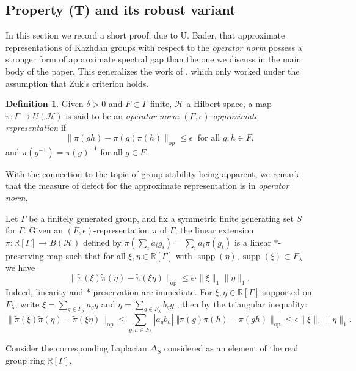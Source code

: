 \documentclass[11pt]{amsart}
\DeclareMathOperator{\op}{op}
\DeclareMathOperator{\supp}{supp}
\newcommand{\cH}{{\mathcal{H}}}
\theoremstyle{definition}
\newtheorem{definition}[theorem]{Definition}
\theoremstyle{remark}
\theoremstyle{definition}
\begin{document}
\subsection{Property (T) and its robust variant}\label{appendix:Bader}



In this section we record a short proof, due to U. Bader, that approximate representations of Kazhdan groups with respect to the \emph{operator norm} possess a stronger form of approximate spectral gap than the one we discuss in the main body of the paper.
This generalizes the work of \cite{Manuilov2007OnAR}, which only worked under the assumption that Zuk's criterion holds.


\begin{definition}
Given $\delta > 0$ and $F \subset \Gamma$ finite, $\cH$ a Hilbert space, a map $\pi: \Gamma \to U(\mathcal H)$ is said to be an \emph{operator norm $(F, \epsilon)$-approximate representation} if
$$ \| \pi(gh) - \pi(g) \pi(h) \|_{\op} \leq \epsilon\; \text{ for all $g,h \in F$,}$$
and $\pi(g^{-1}) = \pi(g)^{-1}$ for all $g \in F$.
\end{definition}

With the connection to the topic of group stability being apparent, we remark that the measure of defect for the approximate representation is in \emph{operator norm}.


Let $\Gamma$ be a finitely generated group, and fix a symmetric finite generating set $S$ for $\Gamma$.
Given an $(F,\epsilon)$-representation $\pi$ of $\Gamma$, the linear extension $\tilde{\pi}: \mathbb R[\Gamma] \to B(\mathcal H)$ defined by $\tilde{\pi}(\sum_i a_i g_i) = \sum_i a_i \pi(g_i)$
is a linear $*$-preserving map such that for all $\xi, \eta \in \mathbb R[\Gamma]$ with $\supp(\eta), \supp(\xi) \subset F_\lambda$ we have
$$\| \tilde{\pi}(\xi)\tilde{\pi}(\eta) - \tilde{\pi}(\xi\eta) \|_{\op} \leq \epsilon \cdot \| \xi \|_1 \| \eta \|_1.$$
Indeed, linearity and $*$-preservation are immediate. For $\xi, \eta \in \mathbb R[\Gamma]$ supported on $F_\lambda$, write $\xi = \sum_{g \in F_\lambda} a_g g$ and $\eta = \sum_{g \in F_\lambda} b_g g$ , then by the triangular inequality:
\begin{equation*}
    \| \tilde{\pi}(\xi) \tilde{\pi}(\eta) - \tilde{\pi}(\xi  \eta) \|_{\op} \leq \sum_{g,h \in F_\lambda} |a_g b_h| \cdot \Vert \pi(g) \pi(h) - \pi(gh) \|_{\op} \leq \epsilon \| \xi \|_1 \| \eta \|_1. 
\end{equation*}

Consider the corresponding Laplacian $\Delta_S$ considered as an element of the real group ring $\mathbb R[\Gamma]$, 
\end{document}

